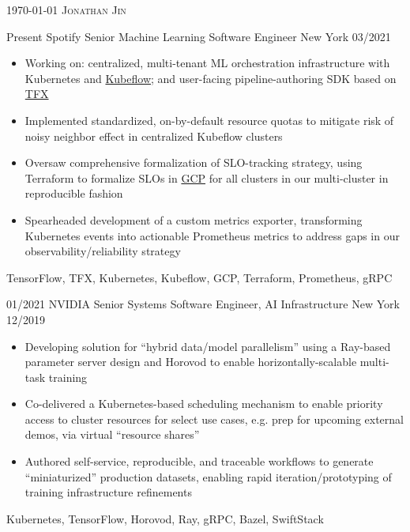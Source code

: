 \documentclass[alternative,10pt,compact]{yaac-another-awesome-cv}
\begin{document}
\makecvheader

\makecvfooter
    {\textsc{\today}}
    {\textsc{Jonathan Jin}}
    {}


\begin{experiences}

  \experience
      {Present}
      {Spotify}
      {Senior Machine Learning Software Engineer}
      {New York}
      {03/2021}{

        \begin{itemize}
        \item Working on: centralized, multi-tenant ML orchestration
          infrastructure with Kubernetes and \href{http://kubeflow.org/}{Kubeflow}; and user-facing
          pipeline-authoring SDK based on \href{http://tensorflow.org/tfx/}{TFX}
        \item Implemented standardized, on-by-default resource quotas to
          mitigate risk of noisy neighbor effect in centralized Kubeflow
          clusters
        \item Oversaw comprehensive formalization of SLO-tracking strategy,
          using Terraform to formalize SLOs in
          \href{https://cloud.google.com/stackdriver/docs/solutions/slo-monitoring}{GCP}
          for all clusters in our multi-cluster in reproducible fashion
        \item Spearheaded development of a custom metrics exporter, transforming
          Kubernetes events into actionable Prometheus metrics to address gaps
          in our observability/reliability strategy
        \end{itemize}
      }
      {TensorFlow, TFX, Kubernetes, Kubeflow, GCP, Terraform, Prometheus, gRPC}

  \emptySeparator

  \experience
      {01/2021}
      {NVIDIA}
      {Senior Systems Software Engineer, AI Infrastructure}
      {New York}
      {12/2019}
      {
        \begin{itemize}
        \item Developing solution for “hybrid data/model parallelism” using a
          Ray-based parameter server design and Horovod to enable
          horizontally-scalable multi-task training
        \item Co-delivered a Kubernetes-based scheduling mechanism to enable
          priority access to cluster resources for select use cases, e.g. prep for
          upcoming external demos, via virtual “resource shares”
        \item Authored self-service, reproducible, and traceable workflows to
          generate “miniaturized” production datasets, enabling rapid
          iteration/prototyping of training infrastructure refinements
        \end{itemize}
      }
      {Kubernetes, TensorFlow, Horovod, Ray, gRPC, Bazel, SwiftStack}


\end{experiences}
\end{document}
